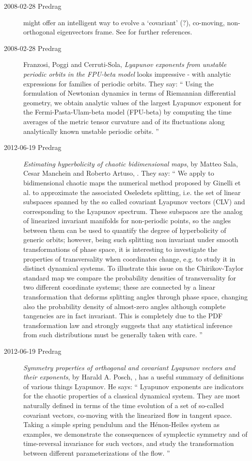 \begin{description}
\item[2008-02-28 Predrag]  might offer an
intelligent way to evolve a `covariant' (?), co-moving, non-orthogonal
{\jacobianM} eigenvectors frame. See  for
further references.

\item[2008-02-28 Predrag]
Franzosi, Poggi and Cerruti-Sola,
{\em Lyapunov exponents from unstable periodic orbits
  in the {FPU}-beta model}
looks impressive -
    with analytic expressions for families of periodic orbits. They say:
    ``
Using the formulation of Newtonian dynamics in terms of Riemannian
differential geometry, we obtain analytic values of the largest
Lyapunov exponent for the Fermi-Pasta-Ulam-beta model (FPU-beta) by
computing the time averages of the metric tensor curvature and of its
fluctuations along analytically known unstable periodic orbits.
    ''

\item[2012-06-19 Predrag]
{\em Estimating hyperbolicity of chaotic bidimensional maps}, by Matteo
Sala, Cesar Manchein and Roberto Artuso, . They say: ``
We apply to bidimensional chaotic maps the numerical method proposed by
Ginelli et al. to approximate the associated Oseledets splitting, i.e.
the set of linear subspaces spanned by the so called covariant Lyapunov
vectors (CLV) and corresponding to the Lyapunov spectrum. These subspaces
are the analog of linearized invariant manifolds for non-periodic points,
so the angles between them can be used to quantify the degree of
hyperbolicity of generic orbits; however, being such splitting non
invariant under smooth transformations of phase space, it is interesting
to investigate the properties of transversality when coordinates change,
e.g. to study it in distinct dynamical systems. To illustrate this issue
on the Chirikov-Taylor standard map we compare the probability densities
of transversality for two different coordinate systems; these are
connected by a linear transformation that deforms splitting angles
through phase space, changing also the probability density of almost-zero
angles although complete tangencies are in fact invariant. This is
completely due to the PDF transformation law and strongly suggests that
any statistical inference from such distributions must be generally taken
with care.
''

\item[2012-06-19 Predrag]                               \toCB
{\em Symmetry properties of orthogonal and covariant {Lyapunov} vectors
and their exponents}, by Harald A. Posch, , has a useful
summary of definitions of various things Lyapunov.
He says: ``
Lyapunov exponents are indicators for the chaotic properties of a
classical dynamical system. They are most naturally defined in terms of
the time evolution of a set of so-called covariant vectors, co-moving
with the linearized flow in tangent space. Taking a simple spring
pendulum and the H\'enon-Heiles system as examples, we demonstrate the
consequences of symplectic symmetry and of time-reversal invariance for
such vectors, and study the transformation between different
parameterizations of the flow.
''


\end{description}
